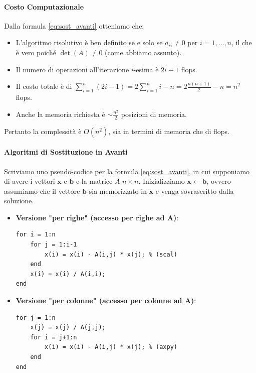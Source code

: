 \paragraph{Costo Computazionale}
Dalla formula \eqref{eq:sost_avanti} otteniamo che:
\begin{itemize}
    \item L'algoritmo risolutivo è ben definito se e solo se $a_{ii} \neq 0$ per $i=1, \dots, n$, il che è vero poiché $\det(A) \neq 0$ (come abbiamo assunto).
    \item Il numero di operazioni all'iterazione $i$-esima è $2i-1$ flops.
    \item Il costo totale è di $\sum_{i=1}^{n}(2i-1) = 2\sum_{i=1}^{n}i - n = 2\frac{n(n+1)}{2} - n = n^2$ flops.
    \item Anche la memoria richiesta è $\sim \frac{n^2}{2}$ posizioni di memoria.
\end{itemize}
Pertanto la complessità è $O(n^2)$, sia in termini di memoria che di flops.

\paragraph{Algoritmi di Sostituzione in Avanti}
Scriviamo uno pseudo-codice per la formula \eqref{eq:sost_avanti}, in cui supponiamo di avere i vettori $\mathbf{x}$ e $\mathbf{b}$ e la matrice $A$ $n \times n$. Inizializziamo $\mathbf{x} \leftarrow \mathbf{b}$, ovvero assumiamo che il vettore $\mathbf{b}$ sia memorizzato in $\mathbf{x}$ e venga sovrascritto dalla soluzione.

\begin{itemize}
    \item \textbf{Versione "per righe" (accesso per righe ad A)}:
    \begin{lstlisting}[numbers=none, frame=none, basicstyle=\ttfamily]
% Algoritmo (5) - Sostituzione in avanti per righe
for i = 1:n
    for j = 1:i-1
        x(i) = x(i) - A(i,j) * x(j); % (scal)
    end
    x(i) = x(i) / A(i,i);
end
    \end{lstlisting}
    
    \item \textbf{Versione "per colonne" (accesso per colonne ad A)}:
    \begin{lstlisting}[numbers=none, frame=none, basicstyle=\ttfamily]
% Algoritmo (6) - Sostituzione in avanti per colonne
for j = 1:n
    x(j) = x(j) / A(j,j);
    for i = j+1:n
        x(i) = x(i) - A(i,j) * x(j); % (axpy)
    end
end
    \end{lstlisting}
\end{itemize}

